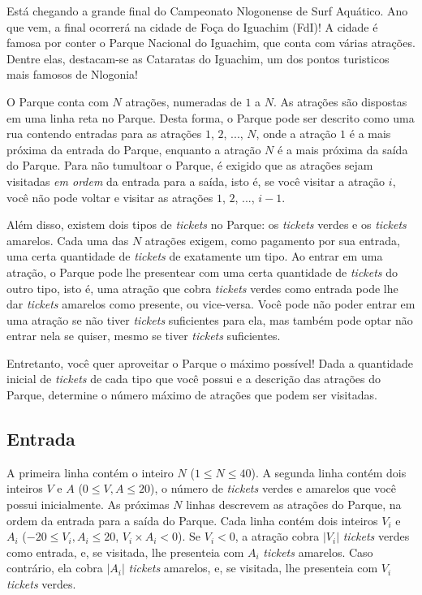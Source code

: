 Está chegando a grande final do Campeonato Nlogonense de Surf Aquático.
Ano que vem, a final ocorrerá na cidade de Foça do Iguachim (FdI)!
A cidade é famosa por conter o Parque Nacional do Iguachim, que conta com várias
atrações. Dentre elas, destacam-se as Cataratas do Iguachim, um dos pontos turisticos
mais famosos de Nlogonia!

O Parque conta com $N$ atrações, numeradas de $1$ a $N$. As atrações são
dispostas em uma linha reta no Parque. Desta forma, o Parque pode ser
descrito como uma rua contendo entradas para as atrações $1$, $2$, ..., $N$, onde a
atração $1$ é a mais próxima da entrada do Parque, enquanto a atração $N$
é a mais próxima da saída do Parque. Para não tumultoar o Parque, é
exigido que as atrações sejam visitadas \textit{em ordem} da entrada para a
saída, isto é, se você visitar a atração $i$, você não pode voltar e visitar as
atrações $1$, $2$, ..., $i-1$.

Além disso, existem dois tipos de \textit{tickets} no Parque: os
\textit{tickets} verdes e os \textit{tickets} amarelos. Cada uma das $N$
atrações exigem, como pagamento por sua entrada, uma certa quantidade de
\textit{tickets} de exatamente um tipo. Ao entrar em uma atração, o Parque pode
lhe presentear com uma certa quantidade de \textit{tickets} do outro tipo, isto
é, uma atração que cobra \textit{tickets} verdes como entrada pode lhe dar
\textit{tickets} amarelos como presente, ou vice-versa. Você pode não poder
entrar em uma atração se não tiver \textit{tickets} suficientes para ela, mas
também pode optar não entrar nela se quiser, mesmo se tiver \textit{tickets}
suficientes.

Entretanto, você quer aproveitar o Parque o máximo possível! Dada a quantidade
inicial de \textit{tickets} de cada tipo que você possui e a descrição das atrações do
Parque, determine o número máximo de atrações que podem ser visitadas.

\subsection*{Entrada}

A primeira linha contém o inteiro $N$ ($1 \leq N \leq 40$). A segunda linha
contém dois inteiros $V$ e $A$ ($0 \leq V, A \leq 20$), o número de
\textit{tickets} verdes e amarelos que você possui inicialmente. As próximas $N$
linhas descrevem as atrações do Parque, na ordem da entrada para a saída do
Parque.
Cada linha contém dois inteiros $V_i$ e $A_i$ ($-20 \leq V_i, A_i \leq 20$, $V_i
\times A_i < 0$). Se $V_i < 0$, a atração cobra $|V_i|$ \textit{tickets}
verdes como entrada, e, se visitada, lhe presenteia com $A_i$ \textit{tickets}
amarelos. Caso contrário, ela cobra $|A_i|$ \textit{tickets} amarelos, e, se
visitada, lhe presenteia com $V_i$ \textit{tickets} verdes.

